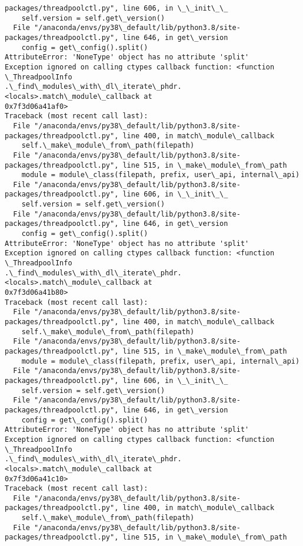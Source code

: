 \documentclass[11pt]{article}
\begin{document}
\begin{Verbatim}[commandchars=\\\{\}]
packages/threadpoolctl.py", line 606, in \_\_init\_\_
    self.version = self.get\_version()
  File "/anaconda/envs/py38\_default/lib/python3.8/site-
packages/threadpoolctl.py", line 646, in get\_version
    config = get\_config().split()
AttributeError: 'NoneType' object has no attribute 'split'
Exception ignored on calling ctypes callback function: <function \_ThreadpoolInfo
.\_find\_modules\_with\_dl\_iterate\_phdr.<locals>.match\_module\_callback at
0x7f3d06a41af0>
Traceback (most recent call last):
  File "/anaconda/envs/py38\_default/lib/python3.8/site-
packages/threadpoolctl.py", line 400, in match\_module\_callback
    self.\_make\_module\_from\_path(filepath)
  File "/anaconda/envs/py38\_default/lib/python3.8/site-
packages/threadpoolctl.py", line 515, in \_make\_module\_from\_path
    module = module\_class(filepath, prefix, user\_api, internal\_api)
  File "/anaconda/envs/py38\_default/lib/python3.8/site-
packages/threadpoolctl.py", line 606, in \_\_init\_\_
    self.version = self.get\_version()
  File "/anaconda/envs/py38\_default/lib/python3.8/site-
packages/threadpoolctl.py", line 646, in get\_version
    config = get\_config().split()
AttributeError: 'NoneType' object has no attribute 'split'
Exception ignored on calling ctypes callback function: <function \_ThreadpoolInfo
.\_find\_modules\_with\_dl\_iterate\_phdr.<locals>.match\_module\_callback at
0x7f3d06a41b80>
Traceback (most recent call last):
  File "/anaconda/envs/py38\_default/lib/python3.8/site-
packages/threadpoolctl.py", line 400, in match\_module\_callback
    self.\_make\_module\_from\_path(filepath)
  File "/anaconda/envs/py38\_default/lib/python3.8/site-
packages/threadpoolctl.py", line 515, in \_make\_module\_from\_path
    module = module\_class(filepath, prefix, user\_api, internal\_api)
  File "/anaconda/envs/py38\_default/lib/python3.8/site-
packages/threadpoolctl.py", line 606, in \_\_init\_\_
    self.version = self.get\_version()
  File "/anaconda/envs/py38\_default/lib/python3.8/site-
packages/threadpoolctl.py", line 646, in get\_version
    config = get\_config().split()
AttributeError: 'NoneType' object has no attribute 'split'
Exception ignored on calling ctypes callback function: <function \_ThreadpoolInfo
.\_find\_modules\_with\_dl\_iterate\_phdr.<locals>.match\_module\_callback at
0x7f3d06a41c10>
Traceback (most recent call last):
  File "/anaconda/envs/py38\_default/lib/python3.8/site-
packages/threadpoolctl.py", line 400, in match\_module\_callback
    self.\_make\_module\_from\_path(filepath)
  File "/anaconda/envs/py38\_default/lib/python3.8/site-
packages/threadpoolctl.py", line 515, in \_make\_module\_from\_path

\end{Verbatim}
\end{document}

